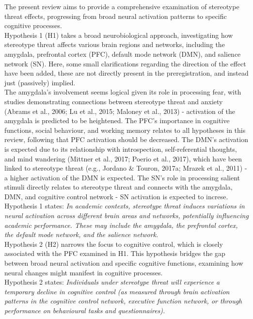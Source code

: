 \documentclass[
  stu, a4paper,floatsintext]{apa7}
\begin{document}
The present review aims to provide a comprehensive examination of stereotype threat effects, progressing from broad neural activation patterns to specific cognitive processes.\\
Hypothesis 1 (H1) takes a broad neurobiological approach, investigating how stereotype threat affects various brain regions and networks, including the amygdala, prefrontal cortex (PFC), default mode network (DMN), and salience network (SN).
Here, some small clarifications regarding the direction of the effect have been added, these are not directly present in the preregistration, and instead just (passively) implied.\\
The amygdala's involvement seems logical given its role in processing fear, with studies demonstrating connections between stereotype threat and anxiety (Abrams et al., 2006; Lu et al., 2015; Maloney et al., 2013) - activation of the amygdala is predicted to be heightened.
The PFC's importance in cognitive functions, social behaviour, and working memory relates to all hypotheses in this review, following that PFC activation should be decreased.
The DMN's activation is expected due to its relationship with introspection, self-referential thoughts, and mind wandering (Mittner et al., 2017; Poerio et al., 2017), which have been linked to stereotype threat (e.g., Jordano \& Touron, 2017a; Mrazek et al., 2011) - a higher activation of the DMN is expected.
The SN's role in processing salient stimuli directly relates to stereotype threat and connects with the amygdala, DMN, and cognitive control network - SN activation is expected to increse.\\
Hypothesis 1 states: \emph{In academic contexts, stereotype threat induces variations in neural activation across different brain areas and networks, potentially influencing academic performance. These may include the amygdala, the prefrontal cortex, the default mode network, and the salience network.}\\
Hypothesis 2 (H2) narrows the focus to cognitive control, which is closely associated with the PFC examined in H1.
This hypothesis bridges the gap between broad neural activation and specific cognitive functions, examining how neural changes might manifest in cognitive processes.\\
Hypothesis 2 states: \emph{Individuals under stereotype threat will experience a temporary decline in cognitive control (as measured through brain activation patterns in the cognitive control network, executive function network, or through performance on behavioural tasks and questionnaires).}
\end{document}
